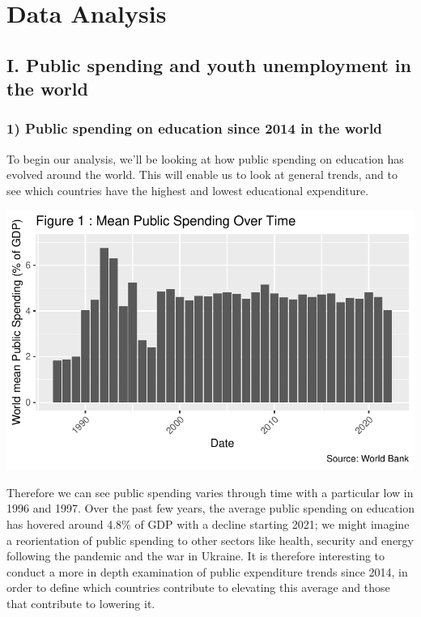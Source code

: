 \documentclass[
  letterpaper,
  DIV=11,
  numbers=noendperiod]{scrartcl}
\begin{document}
\hypertarget{data-analysis}{%
\section{Data Analysis}\label{data-analysis}}

\hypertarget{i.-public-spending-and-youth-unemployment-in-the-world}{%
\subsection{I. Public spending and youth unemployment in the
world}\label{i.-public-spending-and-youth-unemployment-in-the-world}}

\hypertarget{public-spending-on-education-since-2014-in-the-world}{%
\subsubsection{1) Public spending on education since 2014 in the
world}\label{public-spending-on-education-since-2014-in-the-world}}

To begin our analysis, we'll be looking at how public spending on
education has evolved around the world. This will enable us to look at
general trends, and to see which countries have the highest and lowest
educational expenditure.

\includegraphics{Projet-BM_files/figure-pdf/unnamed-chunk-9-1.pdf}

Therefore we can see public spending varies through time with a
particular low in 1996 and 1997. Over the past few years, the average
public spending on education has hovered around 4.8\% of GDP with a
decline starting 2021; we might imagine a reorientation of public
spending to other sectors like health, security and energy following the
pandemic and the war in Ukraine. It is therefore interesting to conduct
a more in depth examination of public expenditure trends since 2014, in
order to define which countries contribute to elevating this average and
those that contribute to lowering it.
\end{document}
